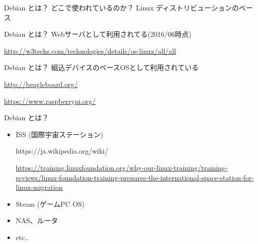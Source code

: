 \begin{frame}{Debian とは？}
どこで使われているのか？\pause
Linux ディストリビューションのベース

  \begin{center}
  \end{center}

\end{frame}

\begin{frame}{Debian とは？}
Webサーバとして利用されてる(2016/06時点)

  \begin{center}
  \end{center}
  \tiny{\url{http://w3techs.com/technologies/details/os-linux/all/all}}

\end{frame}

\begin{frame}{Debian とは？}
組込デバイスのベースOSとして利用されている

 \begin{center}
 \end{center}
 \url{http://beagleboard.org/}

 \begin{center}
 \end{center}
 \url{https://www.raspberrypi.org/}

 \end{frame}

\begin{frame}{Debian とは？}

\begin{itemize}
\item ISS (国際宇宙ステーション)
\begin{center}
 https://ja.wikipedia.org/wiki/%
\end{center}
{\tiny \url{https://training.linuxfoundation.org/why-our-linux-training/training-reviews/linux-foundation-training-prepares-the-international-space-station-for-linux-migration}}

\item Steam (ゲームPC OS)
\item NAS、ルータ
\item etc..
\end{itemize}

\end{frame}

